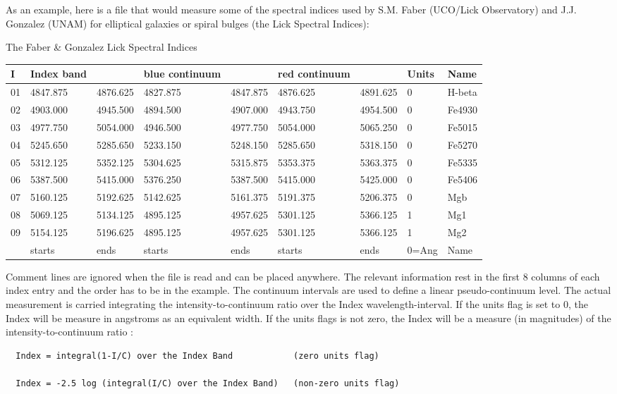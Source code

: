 As an example, here is a file that would measure some of the spectral
indices used by S.M. Faber (UCO/Lick Observatory) and J.J. Gonzalez (UNAM)
for elliptical galaxies or spiral bulges (the Lick Spectral Indices):
\begin{center}
The Faber \& Gonzalez Lick Spectral Indices
\begin{tabular}{lllllllll}
\hline
I &Index band&   &blue continuum& &red continuum&&Units &Name\\  
\hline
  01&4847.875&4876.625&4827.875&4847.875&4876.625&4891.625 &0& H-beta \\
  02&4903.000&4945.500&4894.500&4907.000&4943.750&4954.500 &0& Fe4930 \\
  03&4977.750&5054.000&4946.500&4977.750&5054.000&5065.250 &0& Fe5015 \\
  04&5245.650&5285.650&5233.150&5248.150&5285.650&5318.150 &0& Fe5270 \\
  05&5312.125&5352.125&5304.625&5315.875&5353.375&5363.375 &0& Fe5335 \\
  06&5387.500&5415.000&5376.250&5387.500&5415.000&5425.000 &0& Fe5406 \\
  07&5160.125&5192.625&5142.625&5161.375&5191.375&5206.375 &0& Mgb    \\
  08&5069.125&5134.125&4895.125&4957.625&5301.125&5366.125 &1& Mg1    \\
  09&5154.125&5196.625&4895.125&4957.625&5301.125&5366.125 &1& Mg2    \\
\hline
     & starts &  ends   &  starts & ends   & starts & ends & 0=Ang& Name \\
\hline
\end{tabular}
\end{center}

Comment lines are ignored when the file is read and can be placed anywhere.
The relevant information rest in the first 8 columns of each index entry
and the order has to be in the example. The continuum intervals are used to
define a linear pseudo-continuum level. The actual measurement is carried
integrating the intensity-to-continuum ratio over the Index
wavelength-interval.  If the units flag is set to 0, the Index will be
measure in angstroms as an equivalent width. If the units flags is not
zero, the Index will be a measure (in magnitudes) of the
intensity-to-continuum ratio :
\begin{verbatim}
  Index = integral(1-I/C) over the Index Band            (zero units flag)

  Index = -2.5 log (integral(I/C) over the Index Band)   (non-zero units flag)
\end{verbatim}

